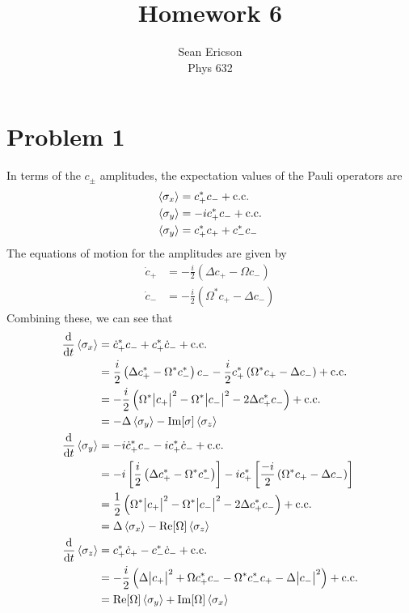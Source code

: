 \documentclass[12pt]{article}
\newcommand{\magsq}[1]{\big|#1\big|^2}
\begin{document}
	
\title{Homework 6}
\author{Sean Ericson \\ Phys 632}
\maketitle

\section*{Problem 1}
In terms of the $c_\pm$ amplitudes, the expectation values of the Pauli operators are
\begin{align*}
    \ev{\sigma_x} &= c_+^*c_- + \text{c.c.} \\
    \ev{\sigma_y} &= -ic_+^*c_- + \text{c.c.} \\
    \ev{\sigma_y} &= c_+^*c_+ + c_-^*c_-
\end{align*}
The equations of motion for the amplitudes are given by
\begin{align*}
    \dot{c}_+ &= -\frac{i}{2}\left(\Delta c_+ - \Omega c_-\right) \\
    \dot{c}_- &= -\frac{i}{2}\left(\Omega^* c_+ - \Delta c_-\right)
\end{align*}
Combining these, we can see that
\begin{align*}
    \dv{t}\ev{\sigma_x} &= \dot{c}_+^* c_- + c_+^* \dot{c}_- + \text{c.c.} \\
    &= \frac{i}{2}\left(\Delta c_+^* - \Omega^* c_-^*\right)c_- - \frac{i}{2}c_+^*\left(\Omega^*c_+ - \Delta c_-\right) + \text{c.c.} \\
    &= -\frac{i}{2}\left(\Omega^* \magsq{c_+} - \Omega^* \magsq{c_-} - 2\Delta c_+^*c_- \right) + \text{c.c.} \\
    &= -\Delta\ev{\sigma_y} - \Im[\sigma]\ev{\sigma_z} \\
    \dv{t}\ev{\sigma_y} &= -i\dot{c}_+^* c_- -ic_+^*\dot{c}_- + \text{c.c.} \\
    &= -i\left[\frac{i}{2}\left(\Delta c_+^* - \Omega^*c_-^*\right)\right] - ic_+^*\left[\frac{-i}{2}\left(\Omega^*c_+ - \Delta c_-\right)\right] \\
    &= \frac{1}{2}\left(\Omega^*\magsq{c_+} - \Omega^*\magsq{c_-}  - 2\Delta c_+^*c_-\right) + \text{c.c.} \\
    &= \Delta\ev{\sigma_x} - \Re[\Omega]\ev{\sigma_z} \\
    \dv{t}\ev{\sigma_z} &= c_+^*\dot{c}_+ - c_-^*\dot{c}_- + \text{c.c.} \\
    &= -\frac{i}{2}\left(\Delta\magsq{c_+} + \Omega c_+^* c_- - \Omega^* c_-^*c_+ - \Delta\magsq{c_-}\right) +\text{c.c.} \\
    &= \Re[\Omega]\ev{\sigma_y} + \Im[\Omega]\ev{\sigma_x}
\end{align*}
\end{document}
